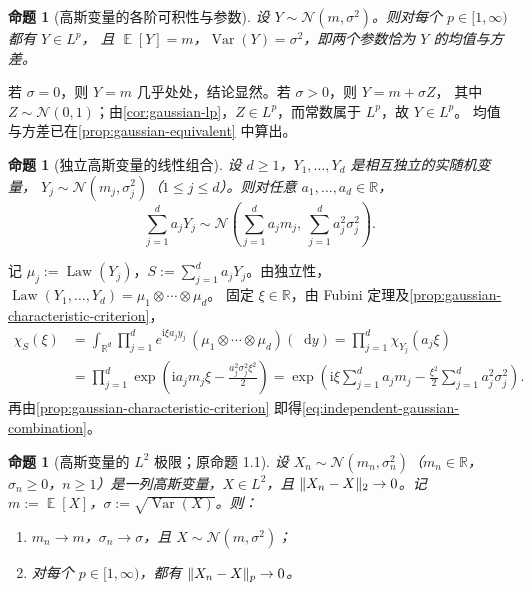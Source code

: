 \documentclass[UTF8,11pt,a4paper,oneside,fontset=fandol]{ctexrep}
\makeatletter
\numberwithin{equation}{section}
\theoremstyle{zhthm}
\newtheorem{proposition}[theorem]{命题}
\renewenvironment{proof}[1][\proofname]{\par
  \pushQED{\qed}%
  \normalfont\topsep6\p@\@plus6\p@\relax
  \trivlist
  \item[\hskip\labelsep\bfseries#1\hspace{0.5em}]\ignorespaces
}{%
  \popQED\endtrivlist\@endpefalse
}
\renewcommand{\proofname}{证明}
\newcommand{\R}{\mathbb{R}}
\DeclareMathOperator{\E}{\mathbb{E}}
\DeclareMathOperator{\Var}{Var}
\DeclareMathOperator{\Law}{Law}
\newcommand{\Normal}{\mathcal{N}}
\newcommand{\iu}{\mathrm{i}}
\newcommand{\dd}{\mathop{}\!\mathrm{d}}
\DeclarePairedDelimiter{\norm}{\lVert}{\rVert}
\makeatother
\begin{document}
\begin{proposition}[高斯变量的各阶可积性与参数]
\label{prop:gaussian-all-lp}
设 $Y\sim\Normal(m,\sigma^2)$。则对每个 $p\in[1,\infty)$ 都有 $Y\in L^p$，
且 $\E[Y]=m$，$\Var(Y)=\sigma^2$，即两个参数恰为 $Y$ 的均值与方差。
\end{proposition}

\begin{proof}
若 $\sigma=0$，则 $Y=m$ 几乎处处，结论显然。若 $\sigma>0$，则 $Y=m+\sigma Z$，
其中 $Z\sim\Normal(0,1)$；由\cref{cor:gaussian-lp}，$Z\in L^p$，而常数属于 $L^p$，故 $Y\in L^p$。
均值与方差已在\cref{prop:gaussian-equivalent} 中算出。
\end{proof}

\begin{proposition}[独立高斯变量的线性组合]
\label{prop:independent-gaussian-combination}
设 $d\ge1$，$Y_1,\ldots,Y_d$ 是相互独立的实随机变量，
$Y_j\sim\Normal(m_j,\sigma_j^2)$（$1\le j\le d$）。则对任意 $a_1,\ldots,a_d\in\R$，
\begin{equation}
  \label{eq:independent-gaussian-combination}
  \sum_{j=1}^{d}a_jY_j\sim\Normal\!\left(\sum_{j=1}^{d}a_jm_j,\ \sum_{j=1}^{d}a_j^2\sigma_j^2\right).
\end{equation}
\end{proposition}

\begin{proof}
记 $\mu_j:=\Law(Y_j)$，$S:=\sum_{j=1}^{d}a_jY_j$。由独立性，
$\Law(Y_1,\ldots,Y_d)=\mu_1\otimes\cdots\otimes\mu_d$。
固定 $\xi\in\R$，由 Fubini 定理及\cref{prop:gaussian-characteristic-criterion}，
\begin{align*}
  \chi_S(\xi)
  &=\int_{\R^d}\prod_{j=1}^{d}e^{\iu\xi a_jy_j}\,(\mu_1\otimes\cdots\otimes\mu_d)(\dd y)
   =\prod_{j=1}^{d}\chi_{Y_j}(a_j\xi)\\
  &=\prod_{j=1}^{d}\exp\!\left(\iu a_jm_j\xi-\frac{a_j^2\sigma_j^2\xi^2}{2}\right)
   =\exp\!\left(\iu\xi\sum_{j=1}^{d}a_jm_j-\frac{\xi^2}{2}\sum_{j=1}^{d}a_j^2\sigma_j^2\right).
\end{align*}
再由\cref{prop:gaussian-characteristic-criterion} 即得\cref{eq:independent-gaussian-combination}。
\end{proof}

\begin{proposition}[高斯变量的 $L^2$ 极限；原命题 1.1]
\label{prop:gaussian-l2-limit}
设 $X_n\sim\Normal(m_n,\sigma_n^2)$（$m_n\in\R$，$\sigma_n\ge0$，$n\ge1$）是一列高斯变量，$X\in L^2$，且
$\norm{X_n-X}_2\to0$。记 $m:=\E[X]$，$\sigma:=\sqrt{\Var(X)}$。则：
\begin{enumerate}
  \item $m_n\to m$，$\sigma_n\to\sigma$，且 $X\sim\Normal(m,\sigma^2)$；
  \item 对每个 $p\in[1,\infty)$，都有 $\norm{X_n-X}_p\to0$。
\end{enumerate}
\end{proposition}
\end{document}
